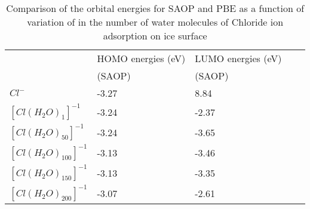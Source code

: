 \documentclass[a4paper,11pt]{report}
\begin{document}
\begin{table}[H]\small
\begin{center}
\caption{Comparison of the orbital energies for SAOP and PBE as a function of variation of in the number of water molecules of Chloride ion adsorption on ice surface} \label{tab:1}
\begin{tabular}{|l|l|l|l|l|}
\hline
&HOMO energies (eV)&LUMO energies (eV)\\
&\hspace*{1.0cm}(SAOP)&\hspace*{1.0cm}(SAOP)\\ 
\hline
$Cl^{-}$&\hspace*{1.0cm}-3.27&\hspace*{1.0cm}8.84\\
\hline
$[Cl(H_{2}O)_{1}]^{-1}$&\hspace*{1.0cm}-3.24&\hspace*{1.0cm}-2.37\\
\hline
$[Cl(H_{2}O)_{50}]^{-1}$&\hspace*{1.0cm}-3.24&\hspace*{1.0cm}-3.65\\
\hline
$[Cl(H_{2}O)_{100}]^{-1}$&\hspace*{1.0cm}-3.13&\hspace*{1.0cm}-3.46\\
\hline
$[Cl(H_{2}O)_{150}]^{-1}$&\hspace*{1.0cm}-3.13&\hspace*{1.0cm}-3.35\\
\hline
$[Cl(H_{2}O)_{200}]^{-1}$&\hspace*{1.0cm}-3.07&\hspace*{1.0cm}-2.61\\
\hline
\end{tabular}
\label{table1}
\end{center}
\end{table}
\end{document}
